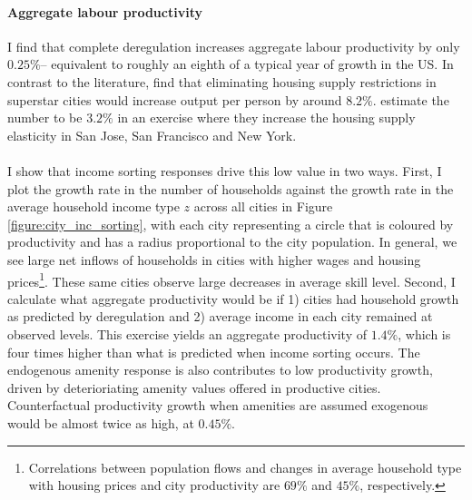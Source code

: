 \documentclass[12pt]{article}
\begin{document}
\paragraph*{Aggregate labour productivity} I find that complete deregulation increases aggregate labour productivity by only $0.25 \%$-- equivalent to roughly an eighth of a typical year of growth in the US. In contrast to the literature, \cite{durantonpugaurbgrowth} find that eliminating housing supply restrictions in superstar cities would increase output per person by around $8.2\%$. \cite{hseihmoretti} estimate the number to be $3.2\%$ in an exercise where they increase the housing supply elasticity in San Jose, San Francisco and New York. 

\paragraph*{}
I show that income sorting responses drive this low value in two ways. First, I plot the growth rate in the number of households against the growth rate in the average household income type $z$ across all cities in Figure \ref{figure:city_inc_sorting}, with each city representing a circle that is coloured by productivity and has a radius proportional to the city population. In general, we see large net inflows of households in cities with higher wages and housing prices\footnote{Correlations between population flows and changes in average household type with housing prices and city productivity are $69\%$ and $45\%$, respectively.}. These same cities observe large decreases in average skill level. Second, I calculate what aggregate productivity would be if 1) cities had household growth as predicted by deregulation and 2) average income in each city remained at observed levels. This exercise yields an aggregate productivity of $1.4\%$, which is four times higher than what is predicted when income sorting occurs. The endogenous amenity response is also contributes to low productivity growth, driven by deterioriating amenity values offered in productive cities. Counterfactual productivity growth when amenities are assumed exogenous would be almost twice as high, at $0.45 \%$.
\end{document}
